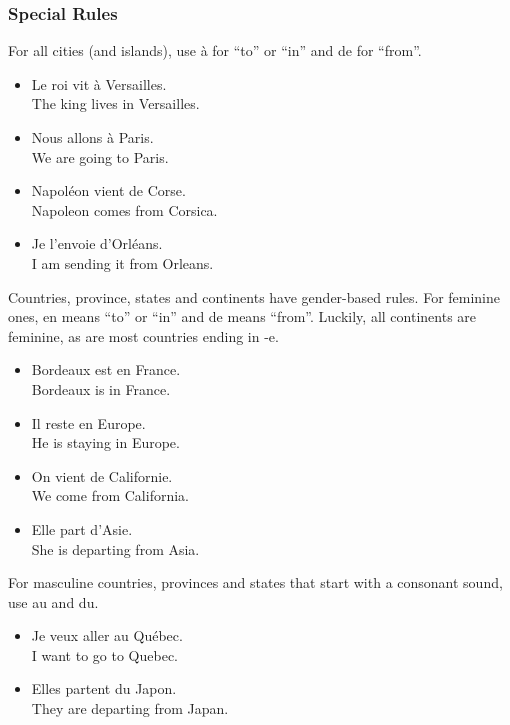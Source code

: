 \subsubsection{Special Rules}

For all cities (and islands), use {\`a} for ``to'' or ``in'' and de for ``from''.

\begin{itemize}
  \item  Le roi vit {\`a} Versailles. \\ The king lives in Versailles.
  \item  Nous allons {\`a} Paris. \\ We are going to Paris.
  \item  Napol{\'e}on vient de Corse. \\ Napoleon comes from Corsica.
  \item  Je l'envoie d'Orl{\'e}ans. \\ I am sending it from Orleans.
\end{itemize}

Countries, province, states and continents have gender-based rules. For feminine ones, en means ``to'' or ``in'' and de means ``from''. Luckily, all continents are feminine, as are most countries ending in -e.

\begin{itemize}
  \item  Bordeaux est en France. \\ Bordeaux is in France.
  \item  Il reste en Europe. \\ He is staying in Europe.
  \item  On vient de Californie. \\ We come from California.
  \item  Elle part d'Asie. \\ She is departing from Asia.
\end{itemize}

For masculine countries, provinces and states that start with a consonant sound, use au and du.

\begin{itemize}
  \item  Je veux aller au Qu{\'e}bec. \\ I want to go to Quebec.
  \item  Elles partent du Japon. \\ They are departing from Japan.
\end{itemize}

